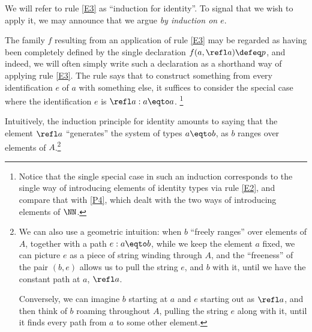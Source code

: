 We will refer to rule \ref{E3} as ``induction for identity''.  To signal that we wish to apply it, we may announce that we argue \emph{by induction on $e$}.

The family $f$ resulting from an application of rule \ref{E3} may be regarded as having been completely defined by the single declaration
$f(a,\refl a) \defeq p$,
and indeed, we will often simply write such a declaration as a shorthand way of applying rule \ref{E3}.
The rule says that to construct something from every identification $e$ of $a$ with something else,
it suffices to consider the special case where the identification $e$ is $\refl a : a \eqto a$.%
\footnote{Notice that the single special case in such an induction corresponds to the single way of introducing elements of
identity types via rule \ref{E2}, and compare that with \ref{P4}, which dealt with the two ways of introducing elements of $\NN$.}

Intuitively, the induction principle for identity amounts to saying that the element $\refl a$ ``generates'' the system of types $a \eqto b$, as $b$
ranges over elements of $A$.\footnote{%
  We can also use a geometric intuition: when $b$ ``freely ranges'' over elements of $A$,
  together with a path $e : a \eqto b$,
  while we keep the element $a$ fixed, we can picture $e$ as a piece of string
  winding through $A$, and the ``freeness'' of the pair $(b,e)$ allows us to pull the string $e$,
  and $b$ with it, until we have the constant path at $a$, $\refl a$.\par
  Conversely, we can imagine $b$ starting at $a$ and $e$ starting out as $\refl a$, and then think of $b$ roaming throughout $A$, pulling
  the string $e$ along with it, until it finds every path from $a$ to some other element.
}

